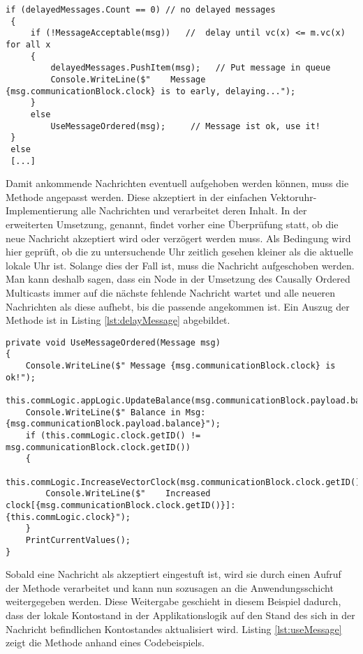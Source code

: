 \begin{lstlisting}[label=lst:delayMessage,
language=sharpc,
float=ht,
firstnumber=1,
caption={Auszug aus der Methode \code{HandleCommunicationMessageOrdered()}. Hier wird geprüft, ob schon aufgeschobenen Nachrichten vorhanden sind und ob die angekommende akzeptiert werden kann.}]
 if (delayedMessages.Count == 0) // no delayed messages
 {
	 if (!MessageAcceptable(msg))   //  delay until vc(x) <= m.vc(x) for all x
	 {
		 delayedMessages.PushItem(msg);   // Put message in queue
		 Console.WriteLine($"    Message {msg.communicationBlock.clock} is to early, delaying...");
	 }
	 else
		 UseMessageOrdered(msg);     // Message ist ok, use it!
 }
 else
 [...]
\end{lstlisting}

Damit ankommende Nachrichten eventuell aufgehoben werden können, muss die Methode  angepasst werden. Diese akzeptiert in der einfachen Vektoruhr-Implementierung alle Nachrichten und verarbeitet deren Inhalt. In der erweiterten Umsetzung,  genannt, findet vorher eine Überprüfung statt, ob die neue Nachricht akzeptiert wird oder verzögert werden muss. Als Bedingung wird hier geprüft, ob die zu untersuchende Uhr zeitlich gesehen kleiner als die aktuelle lokale Uhr ist. Solange dies der Fall ist, muss die Nachricht aufgeschoben werden. Man kann deshalb sagen, dass ein Node in der Umsetzung des Causally Ordered Multicasts immer auf die nächste fehlende Nachricht wartet und alle neueren Nachrichten als diese aufhebt, bis die passende angekommen ist. Ein Auszug der Methode ist in Listing \ref{lst:delayMessage} abgebildet.

\begin{lstlisting}[label=lst:useMessage,
language=sharpc,
float=ht,
firstnumber=1,
caption={Verarbeitung einer akzeptierten Nachricht.}]
private void UseMessageOrdered(Message msg)
{
	Console.WriteLine($" Message {msg.communicationBlock.clock} is ok!");
	this.commLogic.appLogic.UpdateBalance(msg.communicationBlock.payload.balance);
	Console.WriteLine($" Balance in Msg: {msg.communicationBlock.payload.balance}");
	if (this.commLogic.clock.getID() != msg.communicationBlock.clock.getID())
	{
		this.commLogic.IncreaseVectorClock(msg.communicationBlock.clock.getID());
		Console.WriteLine($"    Increased clock[{msg.communicationBlock.clock.getID()}]: {this.commLogic.clock}");
	}
	PrintCurrentValues();
}
\end{lstlisting}

Sobald eine Nachricht als akzeptiert eingestuft ist, wird sie durch einen Aufruf der Methode  verarbeitet und kann nun sozusagen an die Anwendungsschicht weitergegeben werden. Diese Weitergabe geschieht in diesem Beispiel dadurch, dass der lokale Kontostand in der Applikationslogik auf den Stand des sich in der Nachricht befindlichen Kontostandes aktualisiert wird. Listing \ref{lst:useMessage} zeigt die Methode anhand eines Codebeispiels.


